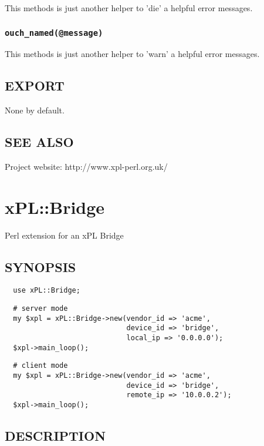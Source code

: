 \documentclass[12pt,a4paper]{article}
\begin{document}
This methods is just another helper to 'die' a helpful error messages.

\subsubsection*{\texttt{ouch\_named(@message)}\label{xPL::Base_ouch_named_message_}}


This methods is just another helper to 'warn' a helpful error messages.

\subsection*{EXPORT\label{xPL::Base_EXPORT}}


None by default.

\subsection*{SEE ALSO\label{xPL::Base_SEE_ALSO}}


Project website: http://www.xpl-perl.org.uk/

\newpage
\section{xPL::Bridge\label{xPL::Bridge}}


Perl extension for an xPL Bridge

\subsection*{SYNOPSIS\label{xPL::Bridge_SYNOPSIS}}
\begin{verbatim}
  use xPL::Bridge;
\end{verbatim}
\begin{verbatim}
  # server mode
  my $xpl = xPL::Bridge->new(vendor_id => 'acme',
                             device_id => 'bridge',
                             local_ip => '0.0.0.0');
  $xpl->main_loop();
\end{verbatim}
\begin{verbatim}
  # client mode
  my $xpl = xPL::Bridge->new(vendor_id => 'acme',
                             device_id => 'bridge',
                             remote_ip => '10.0.0.2');
  $xpl->main_loop();
\end{verbatim}
\subsection*{DESCRIPTION\label{xPL::Bridge_DESCRIPTION}}
\end{document}
